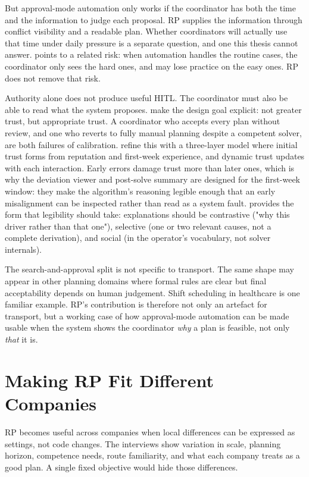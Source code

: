 But approval-mode automation only works if the coordinator has both the time and the information to judge each proposal. RP supplies the information through conflict visibility and a readable plan. Whether coordinators will actually use that time under daily pressure is a separate question, and one this thesis cannot answer. \textcite{bainbridge1983ironies} points to a related risk: when automation handles the routine cases, the coordinator only sees the hard ones, and may lose practice on the easy ones. RP does not remove that risk.

Authority alone does not produce useful HITL. The coordinator must also be able to read what the system proposes. \textcite{lee2004trust} make the design goal explicit: not greater trust, but appropriate trust. A coordinator who accepts every plan without review, and one who reverts to fully manual planning despite a competent solver, are both failures of calibration. \textcite{hoff2015trust} refine this with a three-layer model where initial trust forms from reputation and first-week experience, and dynamic trust updates with each interaction. Early errors damage trust more than later ones, which is why the deviation viewer and post-solve summary are designed for the first-week window: they make the algorithm's reasoning legible enough that an early misalignment can be inspected rather than read as a system fault. \textcite{miller2019explanation} provides the form that legibility should take: explanations should be contrastive ("why this driver rather than that one"), selective (one or two relevant causes, not a complete derivation), and social (in the operator's vocabulary, not solver internals).

The search-and-approval split is not specific to transport. The same shape may appear in other planning domains where formal rules are clear but final acceptability depends on human judgement. Shift scheduling in healthcare is one familiar example. RP's contribution is therefore not only an artefact for transport, but a working case of how approval-mode automation can be made usable when the system shows the coordinator \textit{why} a plan is feasible, not only \textit{that} it is.


\section{Making RP Fit Different Companies}
\label{sec:adaptability}

RP becomes useful across companies when local differences can be expressed as settings, not code changes. The interviews show variation in scale, planning horizon, competence needs, route familiarity, and what each company treats as a good plan. A single fixed objective would hide those differences.

